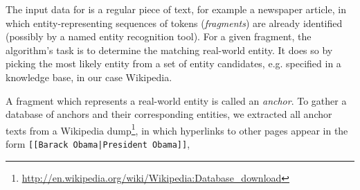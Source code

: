 \documentclass[runningheads,a4paper]{llncs}
\begin{document}
The input data for {\acronym} is a regular piece of text, for example a newspaper article, in which entity-representing sequences of tokens (\emph{fragments}) are already identified (possibly by a named entity recognition tool). For a given fragment, the algorithm's task is to determine the matching real-world entity. It does so by picking the most likely entity from a set of entity candidates, e.g. specified in a knowledge base, in our case Wikipedia. 

A fragment which represents a real-world entity is called an \textit{anchor}. To gather a database of anchors and their corresponding entities, we extracted all anchor texts from a Wikipedia dump\footnote{\url{http://en.wikipedia.org/wiki/Wikipedia:Database_download}}, in which hyperlinks to other pages appear in the form \texttt{[[Barack Obama|President Obama]]}, 
\end{document}
